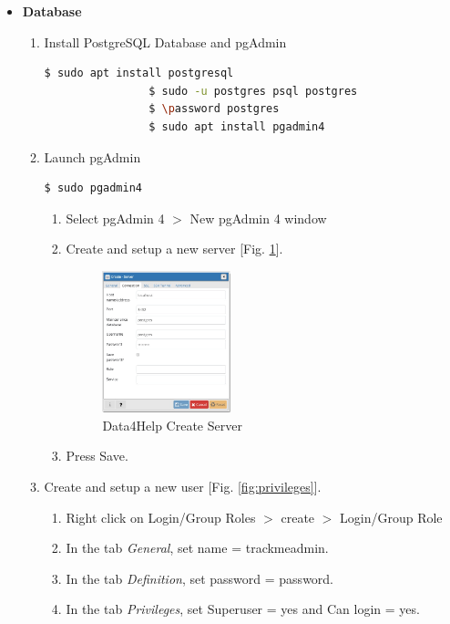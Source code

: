 \documentclass[a4paper, hidelinks, 12pt]{report}
\begin{document}
\begin{itemize}
	\item \textbf{Database}
		\begin{enumerate}
			\item Install PostgreSQL Database and pgAdmin
			\begin{lstlisting}[language=bash]
				$ sudo apt install postgresql
				$ sudo -u postgres psql postgres
				$ \password postgres
				$ sudo apt install pgadmin4
			\end{lstlisting}
			
			\item Launch pgAdmin 
			\begin{lstlisting}[language=bash]
				$ sudo pgadmin4
			\end{lstlisting}
			
			\begin{enumerate}
				\item Select pgAdmin 4 $>$ New pgAdmin 4 window
				\item Create and setup a new server  [Fig. \ref{fig:create_server}].
			
				\begin{figure}[H]
					\centering
				\includegraphics[width=0.4\textwidth]{images/create_server.jpeg}
					\caption[Data4Help Create Server]{Data4Help Create Server}
				\label{fig:create_server}
			\end{figure}
				
				\item Press Save.
			\end{enumerate}			
			
			\item Create and setup a new user [Fig. \ref{fig:privileges}].
			
			\begin{enumerate}
				\item Right click on Login/Group Roles $>$ create $>$ Login/Group Role
				\item In the tab \textit{General}, set name = trackmeadmin.
				\item In the tab \textit{Definition}, set password = password.
				\item In the tab \textit{Privileges}, set Superuser = yes and Can login = yes.
			\end{enumerate}
			

\end{enumerate}
\end{itemize}
\end{document}
